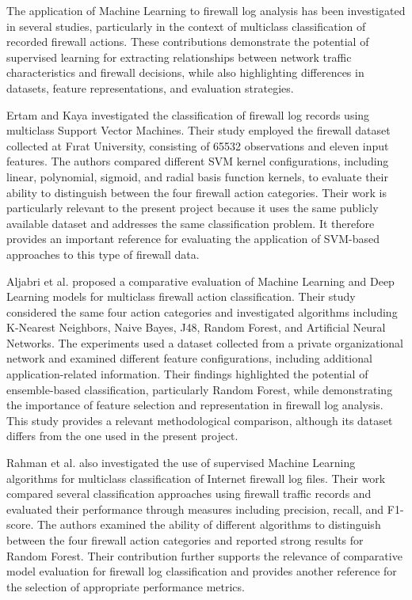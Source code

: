 The application of Machine Learning to firewall log analysis has been investigated in several studies, particularly in the context of multiclass classification of recorded firewall actions. These contributions demonstrate the potential of supervised learning for extracting relationships between network traffic characteristics and firewall decisions, while also highlighting differences in datasets, feature representations, and evaluation strategies.

Ertam and Kaya \cite{ertam2018firewall} investigated the classification of firewall log records using multiclass Support Vector Machines. Their study employed the firewall dataset collected at F{\i}rat University, consisting of \num{65532} observations and eleven input features. The authors compared different SVM kernel configurations, including linear, polynomial, sigmoid, and radial basis function kernels, to evaluate their ability to distinguish between the four firewall action categories. Their work is particularly relevant to the present project because it uses the same publicly available dataset and addresses the same classification problem. It therefore provides an important reference for evaluating the application of SVM-based approaches to this type of firewall data.

Aljabri et al. \cite{aljabri2022firewall} proposed a comparative evaluation of Machine Learning and Deep Learning models for multiclass firewall action classification. Their study considered the same four action categories and investigated algorithms including K-Nearest Neighbors, Naive Bayes, J48, Random Forest, and Artificial Neural Networks. The experiments used a dataset collected from a private organizational network and examined different feature configurations, including additional application-related information. Their findings highlighted the potential of ensemble-based classification, particularly Random Forest, while demonstrating the importance of feature selection and representation in firewall log analysis. This study provides a relevant methodological comparison, although its dataset differs from the one used in the present project.

Rahman et al. \cite{rahman2023firewall} also investigated the use of supervised Machine Learning algorithms for multiclass classification of Internet firewall log files. Their work compared several classification approaches using firewall traffic records and evaluated their performance through measures including precision, recall, and F1-score. The authors examined the ability of different algorithms to distinguish between the four firewall action categories and reported strong results for Random Forest. Their contribution further supports the relevance of comparative model evaluation for firewall log classification and provides another reference for the selection of appropriate performance metrics.

